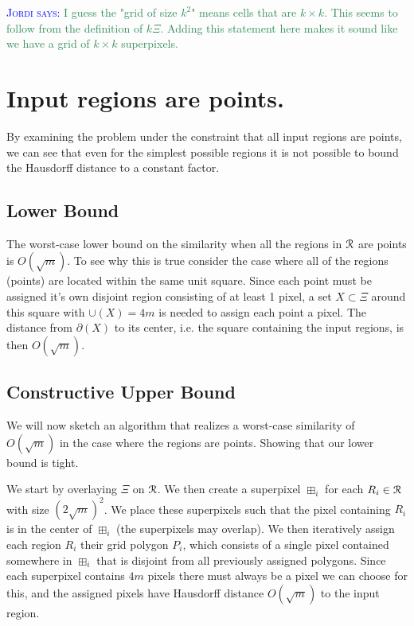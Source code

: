 \documentclass[a4paper,UKenglish,cleveref]{lipics-v2019}
\newcommand{\mremark}[3]{\textcolor{blue}{\textsc{#1 #2:}} \textcolor{SeaGreen}{\textsf{#3}}}
\newcommand{\jordi}[2][says]{\mremark{Jordi}{#1}{#2}}
\newcommand{\spix}{\boxplus}
\begin{document}
\jordi{I guess the "grid of size $k^2$" means cells that are $k \times k$. This seems to follow from the definition of $k\Xi$. Adding this statement here makes it sound like we have a grid of $k \times k$ superpixels.}

\section{Input regions are points.}
\label{sec:points}
By examining the problem under the constraint that all input regions are points, we can see that even for the simplest possible regions it is not possible to bound the Hausdorff distance to a constant factor.





\subsection{Lower Bound}
\label{sub:points_lower}
The worst-case lower bound on the similarity when all the regions in \(\cal R\) are points is \(O(\sqrt{m})\). To see why this is true consider the case where all of the regions (points) are located within the same unit square. Since each point must be assigned it's own disjoint region consisting of at least 1 pixel, a set \(X \subset \Xi\) around this square with \(\cup(X)=4m\) is needed to assign each point a pixel. The distance from \(\partial(X)\) to its center, i.e. the square containing the input regions, is then \(O(\sqrt{m})\).


\subsection{Constructive Upper Bound}
\label{sub:points_upper}
We will now sketch an algorithm that realizes a worst-case similarity of \(O(\sqrt{m})\) in the case where the regions are points. Showing that our lower bound is tight.

We start by overlaying \(\Xi\) on \(\cal R\). We then create a superpixel \(\spix_i\) for each \(R_i \in \cal R\) with size \((2\sqrt{m})^2\). We place these superpixels such that the pixel containing \(R_i\) is in the center of \(\spix_i\) (the superpixels may overlap). We then iteratively assign each region \(R_i\) their grid polygon \(P_i\), which consists of a single pixel contained somewhere in \(\spix_i\) that is disjoint from all previously assigned polygons. Since each superpixel contains \(4m\) pixels there must always be a pixel we can choose for this, and the assigned pixels have Hausdorff distance \(O(\sqrt{m})\) to the input region. 
\end{document}
